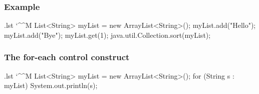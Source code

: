 \documentclass[10pt]{beamer}
\makeatletter
\newenvironment{code}{%
  \begingroup
  \@bsphack
  \immediate\openout\lstvrb@out\jobname.lst
  \let\do\@makeother\dospecials\catcode`\^^M\active
  \def\verbatim@processline{%
    \immediate\write\lstvrb@out{\the\verbatim@line}}%
  \verbatim@start}{%
  \immediate\closeout\lstvrb@out
  \@esphack
  \endgroup
  
  \begin{alertblock}{}
    
  \end{alertblock}}
\makeatother
\begin{document}
\begin{frame}[fragile]
  \frametitle{Example}
  \begin{code}
    List<String> myList = new ArrayList<String>();
    myList.add("Hello");
    myList.add("Bye");
    myList.get(1);
    java.util.Collection.sort(myList);
  \end{code}
\end{frame}

\begin{frame}[fragile]
  \frametitle{The for-each control construct}
  \begin{code}
    List<String> myList = new ArrayList<String>();
    for (String s : myList) {
      System.out.println(s);
    }
  \end{code}
\end{frame}
\end{document}

